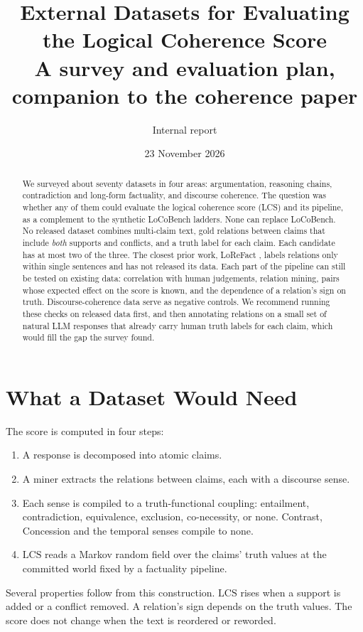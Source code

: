 \documentclass[10pt]{article}
\title{External Datasets for Evaluating the Logical Coherence Score\\
\large A survey and evaluation plan, companion to the coherence paper}
\author{Internal report}
\date{23 November 2026}
\newcommand{\LCS}{\mathrm{LCS}}
\newcommand{\sense}[1]{\textsf{#1}}
\begin{document}
\maketitle

\begin{abstract}
\noindent We surveyed about seventy datasets in four areas: argumentation, reasoning chains,
contradiction and long-form factuality, and discourse coherence. The question was whether any of
them could evaluate the logical coherence score (LCS) and its pipeline, as a complement to the
synthetic LoCoBench ladders. None can replace LoCoBench. No released dataset combines multi-claim
text, gold relations between claims that include \emph{both} supports and conflicts, and a truth
label for each claim. Each candidate has at most two of the three. The closest prior work, LoReFact
\citep{lorefact}, labels relations only within single sentences and has not released its data. Each
part of the pipeline can still be tested on existing data: correlation with human judgements,
relation mining, pairs whose expected effect on the score is known, and the dependence of a
relation's sign on truth. Discourse-coherence data serve as negative controls. We recommend running
these checks on released data first, and then annotating relations on a small set of natural LLM
responses that already carry human truth labels for each claim, which would fill the gap the survey
found.
\end{abstract}

\section{What a Dataset Would Need}

The score is computed in four steps:
\begin{enumerate}
\item A response is decomposed into atomic claims.
\item A miner extracts the relations between claims, each with a discourse sense.
\item Each sense is compiled to a truth-functional coupling: entailment, contradiction,
  equivalence, exclusion, co-necessity, or none. \sense{Contrast}, \sense{Concession} and the
  temporal senses compile to none.
\item $\LCS$ reads a Markov random field over the claims' truth values at the committed world fixed
  by a factuality pipeline.
\end{enumerate}
Several properties follow from this construction. $\LCS$ rises when a support is added or a
conflict removed. A relation's sign depends on the truth values. The score does not change when the
text is reordered or reworded.
\end{document}
